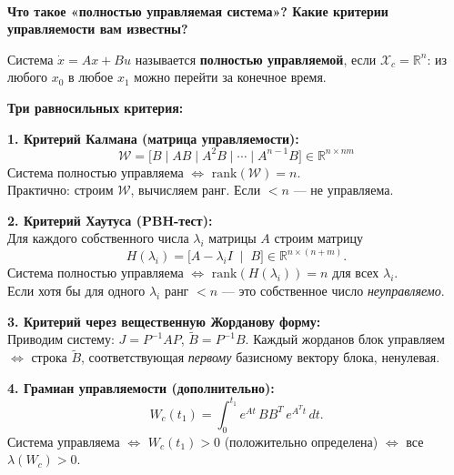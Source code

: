 \documentclass[12pt,a4paper]{article}
\begin{document}
	\begin{qblock}
		\\
		{\bfseries Что такое «полностью управляемая система»? Какие критерии управляемости вам известны?}
		
		\medskip
		Система $\dot{x}=Ax+Bu$ называется \textbf{полностью управляемой}, если $\mathcal{X}_c = \mathbb{R}^n$:
		из любого $x_0$ в любое $x_1$ можно перейти за конечное время.
		
		\medskip\noindent
		\textbf{Три равносильных критерия:}
		
		\medskip\noindent
		\textbf{1. Критерий Калмана (матрица управляемости):}
		\[
		\mathcal{W} = \bigl[B \mid AB \mid A^2B \mid \cdots \mid A^{n-1}B\bigr] \in \mathbb{R}^{n \times nm}
		\]
		Система полностью управляема $\Longleftrightarrow$ $\mathrm{rank}(\mathcal{W}) = n$.\\
		Практично: строим $\mathcal{W}$, вычисляем ранг. Если $< n$ --- не управляема.
		
		\medskip\noindent
		\textbf{2. Критерий Хаутуса (PBH-тест):}\\
		Для каждого собственного числа $\lambda_i$ матрицы $A$ строим матрицу
		\[
		H(\lambda_i) = \bigl[A - \lambda_i I \;\mid\; B\bigr] \in \mathbb{R}^{n \times (n+m)}.
		\]
		Система полностью управляема $\Longleftrightarrow$ $\mathrm{rank}(H(\lambda_i)) = n$ для всех $\lambda_i$.\\
		Если хотя бы для одного $\lambda_i$ ранг $< n$ --- это собственное число \emph{неуправляемо}.
		
		\medskip\noindent
		\textbf{3. Критерий через вещественную Жорданову форму:}\\
		Приводим систему: $J = P^{-1}AP$, $\tilde{B} = P^{-1}B$. Каждый жорданов блок управляем
		$\Longleftrightarrow$ строка $\tilde{B}$, соответствующая \emph{первому} базисному вектору блока, ненулевая.
		
		\medskip\noindent
		\textbf{4. Грамиан управляемости (дополнительно):}
		\[
		W_c(t_1) = \int_0^{t_1} e^{At}\,BB^T\,e^{A^T t}\,dt.
		\]
		Система управляема $\Longleftrightarrow$ $W_c(t_1) > 0$ (положительно определена) $\Longleftrightarrow$
		все $\lambda(W_c) > 0$.
	\end{qblock}
	
\end{document}
